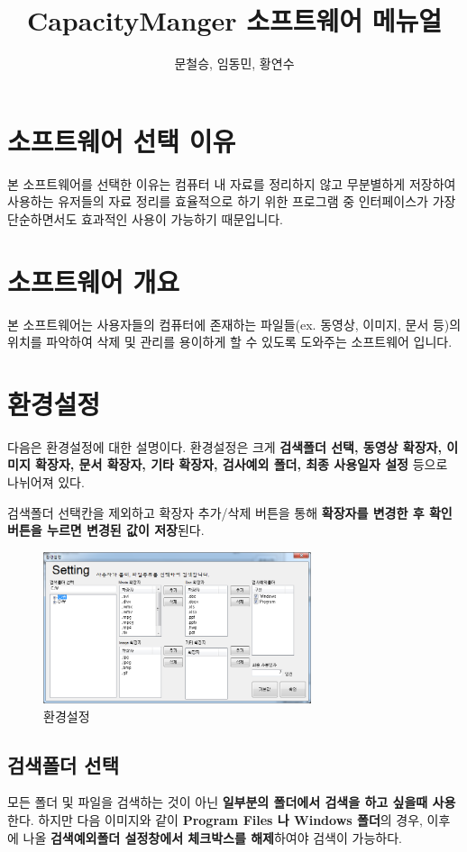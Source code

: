 \documentclass[a4paper, 13pt]{article} %
\title{CapacityManger 소프트웨어 메뉴얼}
\author{문철승, 임동민, 황연수}
\begin{document}
	
	\LARGE \maketitle
	
	\clearpage
	
	\normalsize
	\section{소프트웨어 선택 이유}
	본 소프트웨어를 선택한 이유는 컴퓨터 내 자료를 정리하지 않고 무분별하게 저장하여 사용하는 유저들의 자료 정리를 효율적으로 하기 위한 프로그램 중 인터페이스가 가장 단순하면서도 효과적인 사용이 가능하기 때문입니다.
	\section{소프트웨어 개요}
	본 소프트웨어는 사용자들의 컴퓨터에 존재하는 파일들(ex. 동영상, 이미지, 문서 등)의 위치를 파악하여 삭제 및 관리를 용이하게 할 수 있도록 도와주는 소프트웨어 입니다.
	\section{환경설정}
	다음은 환경설정에 대한 설명이다.	환경설정은 크게 \textbf{검색폴더 선택, 동영상 확장자, 이미지 확장자, 문서 확장자, 기타 확장자, 검사예외 폴더, 최종 사용일자 설정} 등으로 나뉘어져 있다.
	
	검색폴더 선택칸을 제외하고 확장자 추가/삭제 버튼을 통해 \textbf{확장자를 변경한 후 확인 버튼을 누르면 변경된 값이 저장}된다.
	
	\begin{figure}[h]
		\centering
		\includegraphics[width=0.7\textwidth]{Figures/Setting}
		\caption{환경설정}
		\label{fig:setting}
	\end{figure}

		\subsection{검색폴더 선택}
		모든 폴더 및 파일을 검색하는 것이 아닌 \textbf{일부분의 폴더에서 검색을 하고 싶을때 사용}한다. 하지만 다음 이미지와 같이 \textbf{Program Files 나 Windows 폴더}의 경우, 이후에 나올 \textbf{검색예외폴더 설정창에서 체크박스를 해제}하여야 검색이 가능하다.
		
\end{document}
